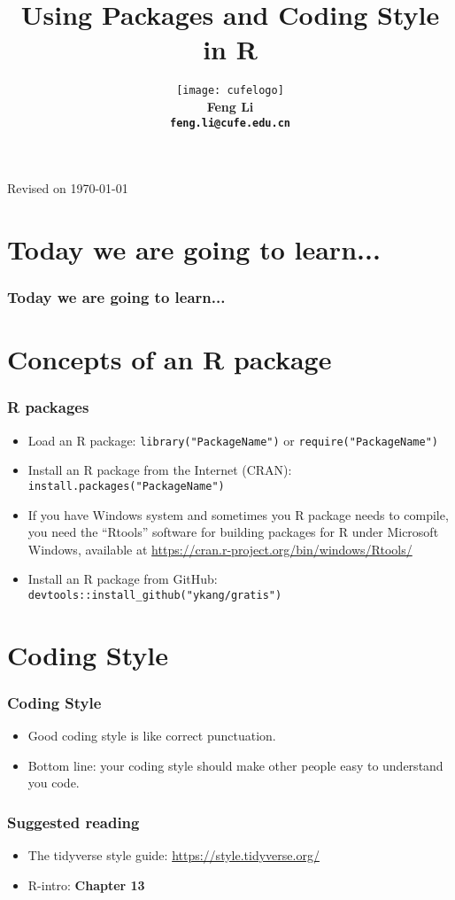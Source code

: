 \documentclass[10pt]{beamer}
\title[Statistical Computing]{{\textbf{Using Packages and Coding Style in R}}}
\author[Feng Li]{\texttt{[image: cufelogo]}\\
  \vspace{0.5cm}\textbf{Feng Li\\\texttt{feng.li@cufe.edu.cn}}}
\date{}
\institute[Stat \& Math, CUFE]{\footnotesize{\textbf{School of Statistics and
      Mathematics\\ Central University of Finance and Economics}}}
\begin{document}
\begin{frame}[plain]
  \titlepage
  \tiny{Revised on \today}
\end{frame}


\section*{Today we are going to learn...}
\begin{frame}
  \frametitle{Today we are going to learn...}
  \tableofcontents
\end{frame}

\section{Concepts of an R package}
\begin{frame}
  \frametitle{R packages}
  \begin{itemize}
   \item Load an R package: \texttt{library("PackageName")} or \texttt{require("PackageName")}
   \item Install an R package from the Internet (CRAN): \texttt{install.packages("PackageName")}

   \item If you have Windows system and sometimes you R package needs to compile, you need
     the ``Rtools'' software for building packages for R under Microsoft Windows,
     available at \url{https://cran.r-project.org/bin/windows/Rtools/}

   \item Install an R package from GitHub: \texttt{devtools::install\_github("ykang/gratis")}
  \end{itemize}
\end{frame}


\section{Coding Style}
\begin{frame}
  \frametitle{Coding Style}
  \begin{itemize}
  \item Good coding style is like correct punctuation.
  \item Bottom line: your coding style should make other people easy to understand you code.

  \end{itemize}
\end{frame}


\begin{frame}
  \frametitle{Suggested reading}

  \begin{itemize}
  \item The tidyverse style guide: \url{https://style.tidyverse.org/}
  \item R-intro: \textbf{Chapter 13}
  \end{itemize}

\end{frame}
\end{document}
